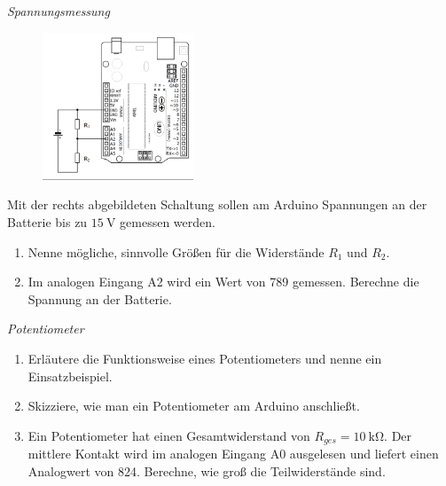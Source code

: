 \begin{aufgabe} \emph{Spannungsmessung}
	
	\begin{figure}
		\centering
		\vspace{-2\baselineskip}
		\includegraphics[width=0.4\textwidth]{./Zeichnungen/schaltplan-spannungsmessung.png}
	\end{figure}
	Mit der rechts abgebildeten Schaltung sollen am Arduino Spannungen an der Batterie bis zu $\SI{15}{\volt}$ gemessen werden.
	\begin{enumerate}[label=\alph*),itemsep=0mm,parsep=0mm]
		\item Nenne mögliche, sinnvolle Größen für die Widerstände $R_1$ und $R_2$.
		\item Im analogen Eingang A2 wird ein Wert von 789 gemessen. Berechne die Spannung an der Batterie.
	\end{enumerate}
\end{aufgabe}

\newpage
\begin{aufgabe} \emph{Potentiometer}
	
	\begin{enumerate}[label=\alph*), itemsep=0mm]
		\item Erläutere die Funktionsweise eines Potentiometers und nenne ein Einsatzbeispiel.
		\item Skizziere, wie man ein Potentiometer am Arduino anschließt.
		\item Ein Potentiometer hat einen Gesamtwiderstand von $R_{ges}=\SI{10}{\kilo\ohm}$. Der mittlere Kontakt wird im analogen Eingang A0 ausgelesen und liefert einen Analogwert von 824. Berechne, wie groß die Teilwiderstände sind. 
	\end{enumerate}
\end{aufgabe}

